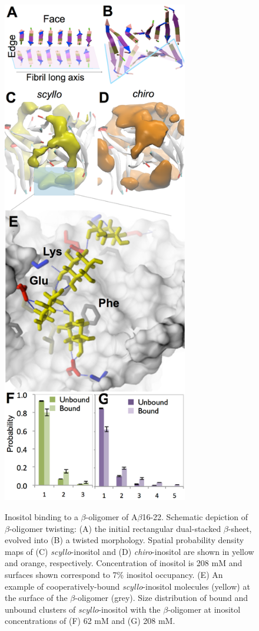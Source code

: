 \begin{figure}
\centering
\includegraphics[width=8.1cm]{figures/results2/inos2_figures_beta.pdf}
\end{figure}
\begin{figure}[t!]
\caption[Inositol binding to a $\beta$-oligomer of A$\beta$16-22]{Inositol binding to a $\beta$-oligomer of A$\beta$16-22. Schematic depiction of $\beta$-oligomer twisting: (A) the initial rectangular dual-stacked $\beta$-sheet, evolved into (B) a twisted morphology. Spatial probability density maps of (C) \emph{scyllo}-inositol and (D) \emph{chiro}-inositol are shown in yellow and orange, respectively.  Concentration of inositol is 208 mM and surfaces shown correspond to 7\% inositol occupancy. (E) An example of cooperatively-bound \emph{scyllo}-inositol molecules (yellow) at the surface of the $\beta$-oligomer (grey). Size distribution of bound and unbound clusters of \emph{scyllo}-inositol with the $\beta$-oligomer at inositol concentrations of (F) 62 mM and (G) 208 mM.}
\label{fig:beta}
\end{figure}


